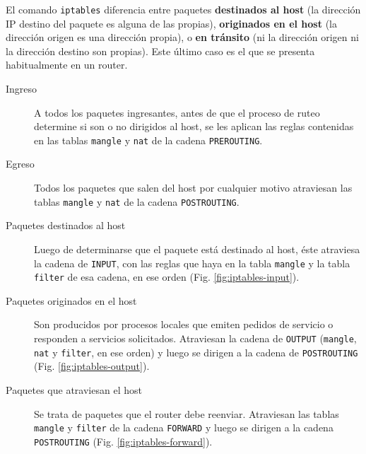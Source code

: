 El comando \texttt{iptables} diferencia entre paquetes \textbf{destinados al host} (la dirección IP destino del paquete es alguna de las propias), \textbf{originados en el host} (la dirección origen es una dirección propia), o \textbf{en tránsito} (ni la dirección origen ni la dirección destino son propias). Este último caso es el que se presenta habitualmente en un router. 

\begin{description}
	\item[Ingreso] A todos los paquetes ingresantes, antes de que el proceso de ruteo determine si son o no dirigidos al host, se les aplican las reglas contenidas en las tablas \texttt{mangle} y \texttt{nat} de la cadena \texttt{PREROUTING}.
	\item[Egreso] Todos los paquetes que salen del host por cualquier motivo atraviesan las tablas \texttt{mangle} y \texttt{nat} de la cadena \texttt{POSTROUTING}. 
	\item[Paquetes destinados al host] Luego de determinarse que el paquete está destinado al host, éste atraviesa la cadena de \texttt{INPUT}, con las reglas que haya en la tabla \texttt{mangle} y la tabla \texttt{filter} de esa cadena, en ese orden (Fig. \ref{fig:iptables-input}). 
	\item[Paquetes originados en el host] Son producidos por procesos locales que emiten pedidos de servicio o responden a servicios solicitados. Atraviesan la cadena de \texttt{OUTPUT} (\texttt{mangle}, \texttt{nat} y \texttt{filter}, en ese orden) y luego se dirigen a la cadena de \texttt{POSTROUTING} (Fig. \ref{fig:iptables-output}). 
	\item[Paquetes que atraviesan el host] Se trata de paquetes que el router debe reenviar. Atraviesan las tablas \texttt{mangle} y \texttt{filter} de la cadena \texttt{FORWARD} y luego se dirigen a la cadena \texttt{POSTROUTING} (Fig. \ref{fig:iptables-forward}).
\end{description}


 
